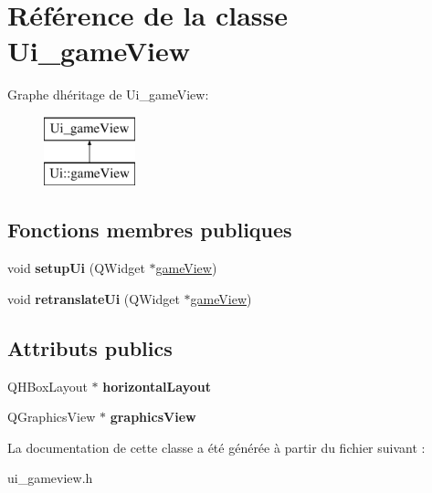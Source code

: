 \hypertarget{class_ui__game_view}{}\section{Référence de la classe Ui\+\_\+game\+View}
\label{class_ui__game_view}
Graphe d\textquotesingle{}héritage de Ui\+\_\+game\+View\+:\begin{figure}[H]
\begin{center}
\leavevmode
\includegraphics[height=2.000000cm]{class_ui__game_view}
\end{center}
\end{figure}
\subsection*{Fonctions membres publiques}
\begin{DoxyCompactItemize}
\item 
\mbox{\label{class_ui__game_view_a30e7e6a046694439fefde608cd9c941c}} 
void {\bfseries setup\+Ui} (Q\+Widget $\ast$\mbox{\hyperlink{classgame_view}{game\+View}})
\item 
\mbox{\label{class_ui__game_view_ab39f94323d887800ca9efa2f1f022ce0}} 
void {\bfseries retranslate\+Ui} (Q\+Widget $\ast$\mbox{\hyperlink{classgame_view}{game\+View}})
\end{DoxyCompactItemize}
\subsection*{Attributs publics}
\begin{DoxyCompactItemize}
\item 
\mbox{\label{class_ui__game_view_a593b8e5a64109b926f659097b12878ee}} 
Q\+H\+Box\+Layout $\ast$ {\bfseries horizontal\+Layout}
\item 
\mbox{\label{class_ui__game_view_a6a5a0e94f8e3bf819d96012624fbb05b}} 
Q\+Graphics\+View $\ast$ {\bfseries graphics\+View}
\end{DoxyCompactItemize}


La documentation de cette classe a été générée à partir du fichier suivant \+:\begin{DoxyCompactItemize}
\item 
ui\+\_\+gameview.\+h\end{DoxyCompactItemize}
